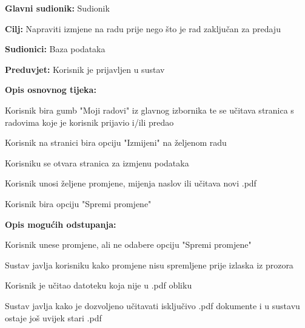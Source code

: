 					\noindent {}
					\begin{packed_item}
						\item \textbf{Glavni sudionik:} Sudionik
						\item \textbf{Cilj:} Napraviti izmjene na radu prije nego što je rad zaključan za predaju
						\item \textbf{Sudionici:} Baza podataka
						\item \textbf{Preduvjet:} Korisnik je prijavljen u sustav
						
						\item \textbf{Opis osnovnog tijeka:} 
						\item[] \begin{packed_enum}
							\item Korisnik bira gumb "Moji radovi" iz glavnog izbornika te se učitava stranica s radovima koje je korisnik prijavio i/ili predao
							\item Korisnik na stranici bira opciju "Izmijeni" na željenom radu
							\item Korisniku se otvara stranica za izmjenu podataka
							\item Korisnik unosi željene promjene, mijenja naslov ili učitava novi .pdf
							\item Korisnik bira opciju "Spremi promjene"
						\end{packed_enum}
					
						\item \textbf{Opis mogućih odstupanja:}
						\item[] \begin{packed_enum}

							\item[2.a] Korisnik unese promjene, ali ne odabere opciju "Spremi promjene"
							\item[] \begin{packed_enum}
								\item[1.] Sustav javlja korisniku kako promjene nisu spremljene prije izlaska iz prozora
							\end{packed_enum}
							\item[2.b] Korisnik je učitao datoteku koja nije u .pdf obliku
							\item[] \begin{packed_enum}
								\item[1.] Sustav javlja kako je dozvoljeno učitavati isključivo .pdf dokumente i u sustavu ostaje još uvijek stari .pdf
							\end{packed_enum}
							
						\end{packed_enum}
					\end{packed_item}

